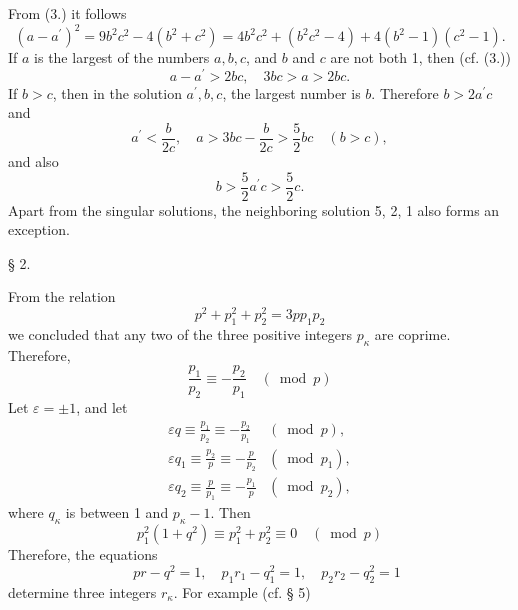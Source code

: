 \documentclass[12pt]{article}
\begin{document}
From (3.) it follows
\begin{equation*}
\left(a-a^{\prime}\right)^{2}=9 b^{2} c^{2}-4\left(b^{2}+c^{2}\right)=4 b^{2} c^{2}+\left(b^{2} c^{2}-4\right)+4\left(b^{2}-1\right)\left(c^{2}-1\right) .
\end{equation*}
If $a$ is the largest of the numbers $a, b, c$, and $b$ and $c$ are not both 1, then (cf. (3.))
\begin{equation*}
a-a^{\prime}>2 b c, \quad 3 b c>a>2 b c . \tag{5.}
\end{equation*}
If $b>c$, then in the solution $a^{\prime}, b, c$, the largest number is $b$. Therefore $b>2a^{\prime}c$ and
\begin{equation*}
a^{\prime}<\frac{b}{2 c}, \quad a>3 b c-\frac{b}{2 c}>\frac{5}{2} b c \quad(b>c), \tag{6.}
\end{equation*}
and also
\begin{equation*}
b>\frac{5}{2} a^{\prime} c>\frac{5}{2} c . \tag{7.}
\end{equation*}
Apart from the singular solutions, the neighboring solution 5, 2, 1 also forms an exception.

\bigskip

\centerline{§ 2.}

\bigskip

From the relation
\begin{equation*}
p^{2}+p_{1}^{2}+p_{2}^{2}=3 p p_{1} p_{2}
\end{equation*}
we concluded that any two of the three positive integers $p_{\kappa}$ are coprime. Therefore,
\begin{equation*}
\frac{p_{1}}{p_{2}} \equiv-\frac{p_{2}}{p_{1}} \quad(\bmod p) \tag{1.}
\end{equation*}
Let $\varepsilon= \pm 1$, and let
\begin{align*}
\varepsilon q \equiv \frac{p_{1}}{p_{2}} \equiv-\frac{p_{2}}{p_{1}} & (\bmod p), \\
\varepsilon q_{1} \equiv \frac{p_{2}}{p} \equiv-\frac{p}{p_{2}} & \left(\bmod p_{1}\right),  \tag{2.}\\
\varepsilon q_{2} \equiv \frac{p}{p_{1}} \equiv-\frac{p_{1}}{p} & \left(\bmod p_{2}\right),
\end{align*}
where $q_{\kappa}$ is between 1 and $p_{\kappa}-1$. Then
\begin{equation*}
p_{1}^{2}\left(1+q^{2}\right) \equiv p_{1}^{2}+p_{2}^{2} \equiv 0 \quad(\bmod p)
\end{equation*}
Therefore, the equations
\begin{equation*}
\quad p r-q^{2}=1, \quad p_{1} r_{1}-q_{1}^{2}=1, \quad p_{2} r_{2}-q_{2}^{2}=1
\tag{3}
\end{equation*}
determine three integers $r_{\kappa}$. For example (cf. § 5)
\end{document}

